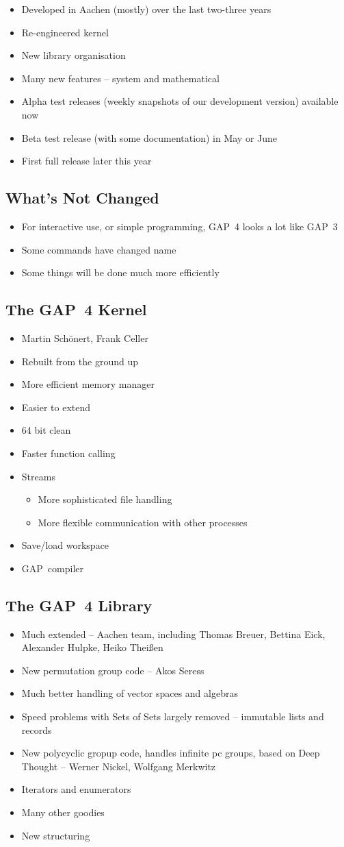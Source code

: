 \documentclass[11pt]{article}
\def\bs{\begin{slide}}
\def\es{\end{slide}}
\def\bi{\begin{itemize}}
\def\ei{\end{itemize}}
\def\GAP{\textsf{GAP}}
\begin{document}
\begin{slide}
\bi
\item Developed in Aachen (mostly) over the last two-three years
\item Re-engineered kernel
\item New library organisation 
\item Many new features -- system and mathematical
\item Alpha test releases (weekly snapshots of our development
version) available now
\item Beta test release (with some documentation) in May or June
\item First full release later this year
\ei
\es
\bs
\subsection{What's Not Changed}
\bi
\item For interactive use, or simple programming, \GAP\ 4 looks a lot
like \GAP\ 3
\item Some commands have changed name
\item Some things will be done much more efficiently 
\ei

\es
\bs
\subsection{The \GAP\ 4 Kernel}
\bi
\item Martin Sch\"onert, Frank Celler
\item Rebuilt from the ground up
\item More efficient memory manager
\item Easier to extend
\item 64 bit clean
\item Faster function calling
\item Streams 
\bi
\item More sophisticated file handling 
\item More flexible communication with other processes
\ei
\item Save/load workspace
\item \GAP\ compiler
\ei
\es
\bs
\subsection{The \GAP\ 4 Library}
\bi
\item Much extended -- Aachen team, including Thomas Breuer, Bettina
Eick, Alexander Hulpke, Heiko Thei\ss en
\item New permutation group code -- Akos Seress
\item Much better handling of vector spaces and algebras 
\item Speed problems with Sets of Sets largely removed -- immutable
lists and records
\item New polycyclic gropup code, handles infinite pc groups, based on
Deep Thought -- Werner Nickel, Wolfgang Merkwitz
\item Iterators and enumerators
\item Many other goodies
\item New structuring 
\ei
\es
\bs

\end{slide}
\end{document}

